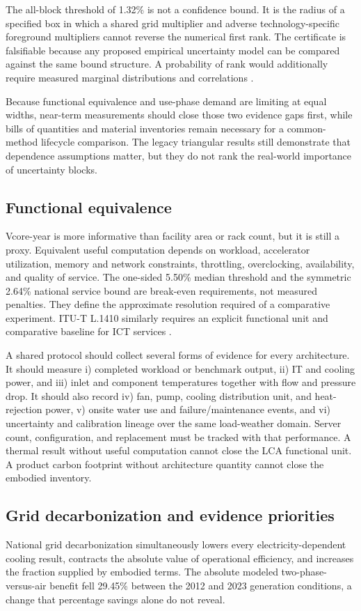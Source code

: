 \documentclass[review,12pt]{elsarticle}
\begin{document}
The all-block threshold of 1.32\% is not a confidence bound. It is the radius of a specified box in which a shared grid multiplier and adverse technology-specific foreground multipliers cannot reverse the numerical first rank. The certificate is falsifiable because any proposed empirical uncertainty model can be compared against the same bound structure. A probability of rank would additionally require measured marginal distributions and correlations \cite{ref30}.

Because functional equivalence and use-phase demand are limiting at equal widths, near-term measurements should close those two evidence gaps first, while bills of quantities and material inventories remain necessary for a common-method lifecycle comparison. The legacy triangular results still demonstrate that dependence assumptions matter, but they do not rank the real-world importance of uncertainty blocks.

\subsection{Functional equivalence}
Vcore-year is more informative than facility area or rack count, but it is still a proxy. Equivalent useful computation depends on workload, accelerator utilization, memory and network constraints, throttling, overclocking, availability, and quality of service. The one-sided 5.50\% median threshold and the symmetric 2.64\% national service bound are break-even requirements, not measured penalties. They define the approximate resolution required of a comparative experiment. ITU-T L.1410 similarly requires an explicit functional unit and comparative baseline for ICT services \cite{ref18}.

A shared protocol should collect several forms of evidence for every architecture. It should measure i) completed workload or benchmark output, ii) IT and cooling power, and iii) inlet and component temperatures together with flow and pressure drop. It should also record iv) fan, pump, cooling distribution unit, and heat-rejection power, v) onsite water use and failure/maintenance events, and vi) uncertainty and calibration lineage over the same load-weather domain. Server count, configuration, and replacement must be tracked with that performance. A thermal result without useful computation cannot close the LCA functional unit. A product carbon footprint without architecture quantity cannot close the embodied inventory.

\subsection{Grid decarbonization and evidence priorities}
National grid decarbonization simultaneously lowers every electricity-dependent cooling result, contracts the absolute value of operational efficiency, and increases the fraction supplied by embodied terms. The absolute modeled two-phase-versus-air benefit fell 29.45\% between the 2012 and 2023 generation conditions, a change that percentage savings alone do not reveal.
\end{document}
